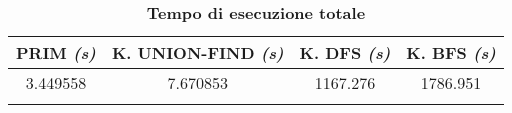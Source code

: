 \begin{longtable}{|c|c|c|c|}
\hline
\textbf{PRIM} \textit{(s)} & \textbf{K. UNION-FIND} \textit{(s)} & \textbf{K. DFS} \textit{(s)} & \textbf{K. BFS} \textit{(s)} \\ \hline
3.449558      & 7.670853               & 1167.276        & 1786.951        \\ \hline  
\caption{\textbf{Tempo di esecuzione totale}}
\end{longtable}